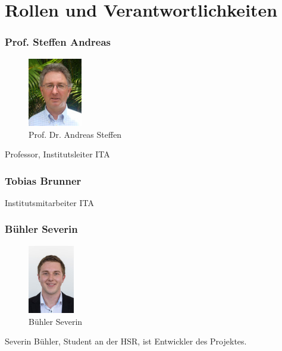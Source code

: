 \section{Rollen und Verantwortlichkeiten}

\subsubsection{Prof. Steffen Andreas}
\noindent\begin{minipage}{0.5\textwidth}
\begin{figure}[H]
	\centering
	\includegraphics[height=30mm]{images/asteffen.jpg}
	\caption{Prof. Dr. Andreas Steffen}
\end{figure}
\end{minipage}
\hfill
\begin{minipage}{0.5\textwidth}
Professor, Institutsleiter ITA \\
\end{minipage}


\subsubsection{Tobias Brunner}
\noindent\begin{minipage}{0.5\textwidth}
\end{minipage}
\hfill
\begin{minipage}{0.5\textwidth}
Institutsmitarbeiter ITA \\
\end{minipage}

\subsubsection{Bühler Severin}
\noindent\begin{minipage}{0.5\textwidth}
\begin{figure}[H]
	\centering
	\includegraphics[height=30mm]{images/sbuehler.jpg}
	\caption{Bühler Severin}
\end{figure}
\end{minipage}
\hfill
\begin{minipage}{0.5\textwidth}
Severin Bühler, Student an der HSR, ist Entwickler des Projektes. \\
\end{minipage}

